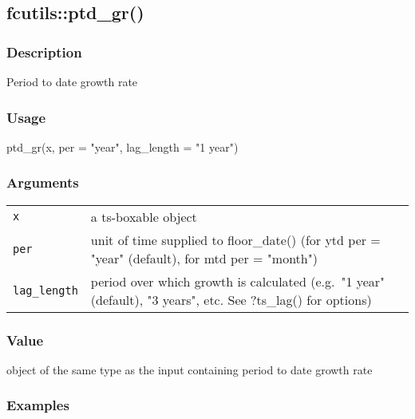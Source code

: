 \documentclass[
  letterpaper,
  DIV=11,
  numbers=noendperiod]{scrreport}
\newenvironment{Shaded}{\begin{snugshade}}{\end{snugshade}}
\newcommand{\AttributeTok}[1]{\textcolor[rgb]{0.40,0.45,0.13}{#1}}
\newcommand{\FunctionTok}[1]{\textcolor[rgb]{0.28,0.35,0.67}{#1}}
\newcommand{\NormalTok}[1]{\textcolor[rgb]{0.00,0.23,0.31}{#1}}
\newcommand{\StringTok}[1]{\textcolor[rgb]{0.13,0.47,0.30}{#1}}
\begin{document}
\subsection{fcutils::ptd\_gr()}\label{fcutilsptd_gr}

\subsubsection{Description}\label{description-44}

Period to date growth rate

\subsubsection{Usage}\label{usage-44}

\begin{Shaded}
\begin{Highlighting}[]
\FunctionTok{ptd\_gr}\NormalTok{(x, }\AttributeTok{per =} \StringTok{"year"}\NormalTok{, }\AttributeTok{lag\_length =} \StringTok{"1 year"}\NormalTok{)}
\end{Highlighting}
\end{Shaded}

\subsubsection{Arguments}\label{arguments-44}

\begin{longtable}[]{@{}ll@{}}
\toprule\noalign{}
\endhead
\bottomrule\noalign{}
\endlastfoot
\texttt{x} & a ts-boxable object \\
\texttt{per} & unit of time supplied to floor\_date() (for ytd per =
"year" (default), for mtd per = "month") \\
\texttt{lag\_length} & period over which growth is calculated (e.g.~"1
year" (default), "3 years", etc. See ?ts\_lag() for options) \\
\end{longtable}

\subsubsection{Value}\label{value-44}

object of the same type as the input containing period to date growth
rate

\subsubsection{Examples}\label{examples-44}
\end{document}
